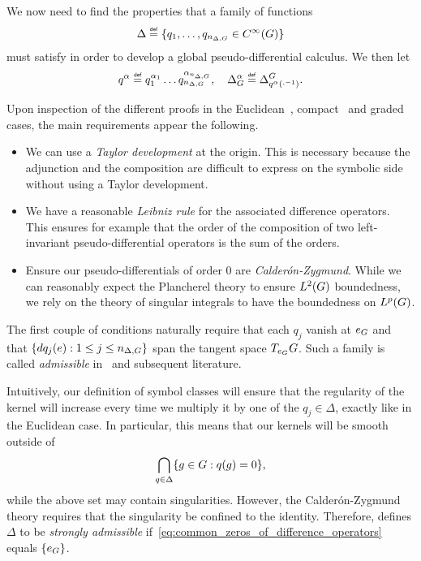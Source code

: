 We now need to find the properties that a family of functions
\begin{align*}
    \Delta \defeq \{q_1, \dots, q_{\dimDifferenceOperators} \in \SmoothFunctions \Group\}
\end{align*}
must satisfy in order to develop a global pseudo-differential calculus.
We then let
\begin{align*}
    q^\alpha \defeq q^{\alpha_1}_1 \dots q^{\alpha_{\dimDifferenceOperators}}_{\dimDifferenceOperators},   
    \quad \DifferenceOperatorOrder \alpha \defeq \DifferenceOperator {q^\alpha(\dummy^{-1})}.
\end{align*}

Upon inspection of the different proofs in the Euclidean~\cite{Stein93},
compact~\cite{RuzhanskyTurunen10,Fischer2015} and graded~\cite{FischerRuzhansky16} cases,
the main requirements appear the following.
\begin{itemize}
    \item We can use a \emph{Taylor development} at the origin.
        This is necessary because the adjunction and the composition are difficult to express on the symbolic side without using a Taylor development.
    \item We have a reasonable \emph{Leibniz rule} for the associated difference operators.
        This ensures for example that the order of the composition of two left-invariant pseudo-differential operators is the sum of the orders.
    \item Ensure our pseudo-differentials of order $0$ are \emph{Calder\'on-Zygmund}.
        While we can reasonably expect the Plancherel theory to ensure ${L^{2} (G)}$ boundedness,
        we rely on the theory of singular integrals to have the boundedness on ${L^{p} (G)}$.
\end{itemize}

The first couple of conditions naturally require that each $q_j$ vanish at $e_G$ and that $\{dq_j(e) : 1 \leq j \leq n_{\Delta, G}\}$ span the tangent space $T_{e_G} G$.
Such a family is called \emph{admissible} in~\cite{RuzhanskyTurunenWirth10} and subsequent literature.

Intuitively,
our definition of symbol classes will ensure that the regularity of the kernel will increase every time we multiply it by one of the $q_j \in \Delta$,
exactly like in the Euclidean case.
In particular,
this means that our kernels will be smooth outside of
\begin{align}
    \bigcap_{q \in \Delta} \{g \in G : q(g) = 0\},
    \label{eq:common_zeros_of_difference_operators}
\end{align}
while the above set may contain singularities.
However,
the Calder\'on-Zygmund theory requires that the singularity be confined to the identity.
Therefore,
\cite{RuzhanskyTurunenWirth10} defines $\Delta$ to be \emph{strongly admissible}
if~\eqref{eq:common_zeros_of_difference_operators} equals $\{e_G\}$.

